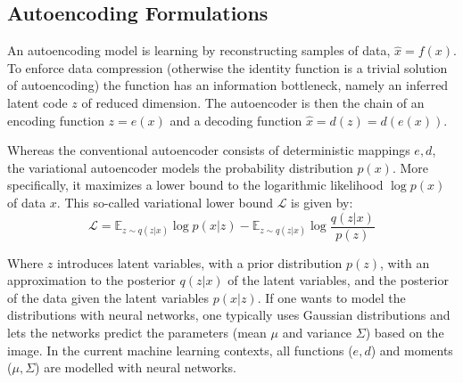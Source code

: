 	\subsection{Autoencoding Formulations}\label{sec:autoencoding}
		An autoencoding model is learning by reconstructing samples of data, $\hat x = f(x)$. To enforce data compression (otherwise the identity function is a trivial solution of autoencoding) the function has an information bottleneck, namely an inferred latent code $z$ of reduced dimension. The autoencoder is then the chain of an encoding function $z = e(x)$ and a decoding function $\hat x = d(z) = d(e(x))$.

		Whereas the conventional autoencoder consists of deterministic mappings $e, d$, the {variational autoencoder} \cite{kingma13vae} models the probability distribution $p(x)$. More specifically, it maximizes a lower bound to the logarithmic likelihood $\log p(x)$ of data $x$. This so-called variational lower bound $\mathcal{L}$ is given by:
		\begin{equation}\label{eq:vae}
			\mathcal{L} = \mathds{E}_{z\sim q(z|x)}  \log p(x|z) - \mathds{E}_{z\sim q(z|x)} \log \frac{q(z|x)}{p(z)}
		\end{equation}

		Where $z$ introduces latent variables, with a prior distribution $p(z)$, with an approximation to the posterior $q(z|x)$ of the latent variables, and the posterior of the data given the latent variables $p(x|z)$. If one wants to model the distributions with neural networks, one typically uses Gaussian distributions and lets the networks predict the parameters (mean $\mu$ and variance $\Sigma$) based on the image.
		In the current machine learning contexts, all functions ($e, d$) and moments ($\mu, \Sigma$) are modelled with neural networks.

